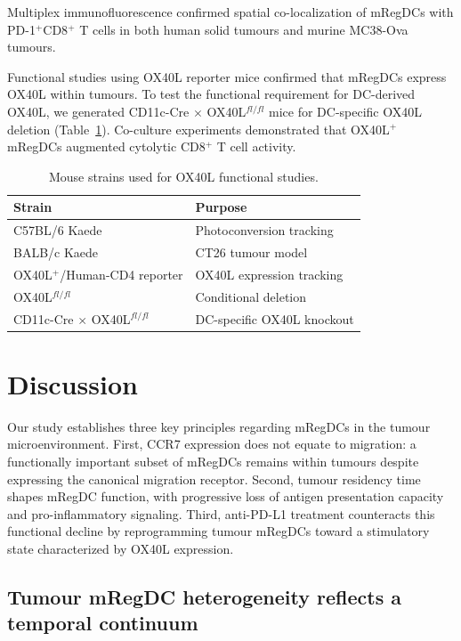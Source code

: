 \documentclass[11pt]{article}
\begin{document}
Multiplex immunofluorescence confirmed spatial co-localization of mRegDCs with PD-1$^{+}$CD8$^{+}$ T cells in both human solid tumours and murine MC38-Ova tumours.

Functional studies using OX40L reporter mice confirmed that mRegDCs express OX40L within tumours. To test the functional requirement for DC-derived OX40L, we generated CD11c-Cre $\times$ OX40L$^{fl/fl}$ mice for DC-specific OX40L deletion (Table~\ref{tab:ox40l}). Co-culture experiments demonstrated that OX40L$^{+}$ mRegDCs augmented cytolytic CD8$^{+}$ T cell activity.

\begin{table}[ht]
\centering
\caption{Mouse strains used for OX40L functional studies.}
\label{tab:ox40l}
\begin{tabular}{ll}
\toprule
Strain & Purpose \\
\midrule
C57BL/6 Kaede & Photoconversion tracking \\
BALB/c Kaede & CT26 tumour model \\
OX40L$^{+}$/Human-CD4 reporter & OX40L expression tracking \\
OX40L$^{fl/fl}$ & Conditional deletion \\
CD11c-Cre $\times$ OX40L$^{fl/fl}$ & DC-specific OX40L knockout \\
\bottomrule
\end{tabular}
\end{table}

\section{Discussion}

Our study establishes three key principles regarding mRegDCs in the tumour microenvironment. First, CCR7 expression does not equate to migration: a functionally important subset of mRegDCs remains within tumours despite expressing the canonical migration receptor. Second, tumour residency time shapes mRegDC function, with progressive loss of antigen presentation capacity and pro-inflammatory signaling. Third, anti-PD-L1 treatment counteracts this functional decline by reprogramming tumour mRegDCs toward a stimulatory state characterized by OX40L expression.

\subsection{Tumour mRegDC heterogeneity reflects a temporal continuum}
\end{document}
